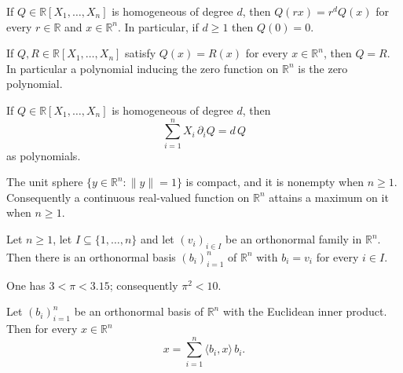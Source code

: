 \begin{proposition}
If $Q\in\mathbb{R}[X_1,\dots,X_n]$ is homogeneous of degree $d$, then
$Q(rx)=r^{d}Q(x)$ for every $r\in\mathbb{R}$ and $x\in\mathbb{R}^n$. In
particular, if $d\ge1$ then $Q(0)=0$.
\end{proposition}

\begin{proposition}
If $Q,R\in\mathbb{R}[X_1,\dots,X_n]$ satisfy $Q(x)=R(x)$ for every
$x\in\mathbb{R}^n$, then $Q=R$. In particular a polynomial inducing the zero
function on $\mathbb{R}^n$ is the zero polynomial.
\end{proposition}

\begin{proposition}
If $Q\in\mathbb{R}[X_1,\dots,X_n]$ is homogeneous of degree $d$, then
\[
  \sum_{i=1}^{n}X_i\,\partial_iQ=d\,Q
\]
as polynomials.
\end{proposition}

\begin{proposition}
The unit sphere $\{y\in\mathbb{R}^n:\lVert y\rVert=1\}$ is compact, and it is
nonempty when $n\ge1$. Consequently a continuous real-valued function on
$\mathbb{R}^n$ attains a maximum on it when $n\ge1$.
\end{proposition}

\begin{proposition}
Let $n\ge1$, let $I\subseteq\{1,\dots,n\}$ and let $(v_i)_{i\in I}$ be an
orthonormal family in $\mathbb{R}^n$. Then there is an orthonormal basis
$(b_i)_{i=1}^{n}$ of $\mathbb{R}^n$ with $b_i=v_i$ for every $i\in I$.
\end{proposition}

\begin{proposition}
One has $3<\pi<3.15$; consequently $\pi^2<10$.
\end{proposition}

\begin{proposition}
Let $(b_i)_{i=1}^{n}$ be an orthonormal basis of $\mathbb{R}^n$ with the
Euclidean inner product. Then for every $x\in\mathbb{R}^n$
\[
  x=\sum_{i=1}^{n}\langle b_i,x\rangle\,b_i .
\]
\end{proposition}

